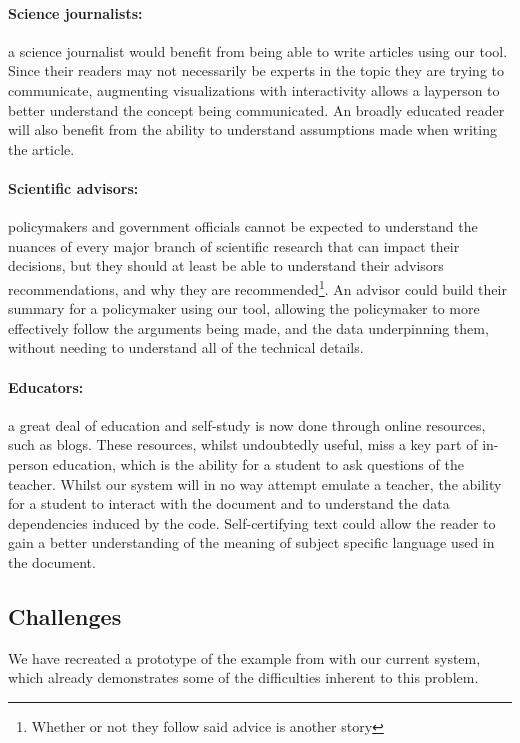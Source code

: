 \paragraph{Science journalists:} a science journalist would benefit from being able to write articles using
our tool. Since their readers may not necessarily be experts in the topic they are trying to communicate,
augmenting visualizations with interactivity allows a layperson to better understand the concept being
communicated. An broadly educated reader will also benefit from the ability to understand assumptions made
when writing the article.

\paragraph{Scientific advisors:} policymakers and government officials cannot be expected to understand the
nuances of every major branch of scientific research that can impact their decisions, but they should at least
be able to understand their advisors recommendations, and why they are recommended\footnote{Whether or not
they follow said advice is another story}. An advisor could build their summary for a policymaker using our
tool, allowing the policymaker to more effectively follow the arguments being made, and the data underpinning
them, without needing to understand all of the technical details.

\paragraph{Educators:} a great deal of education and self-study is now done through online resources, such as
blogs. These resources, whilst undoubtedly useful, miss a key part of in-person education, which is the
ability for a student to ask questions of the teacher. Whilst our system will in no way attempt emulate a
teacher, the ability for a student to interact with the document and to understand the data dependencies
induced by the code. Self-certifying text could allow the reader to gain a better understanding of the meaning
of subject specific language used in the document.

\subsection{Challenges}

We have recreated a prototype of the example from  with our current system, which already
demonstrates some of the difficulties inherent to this problem.

